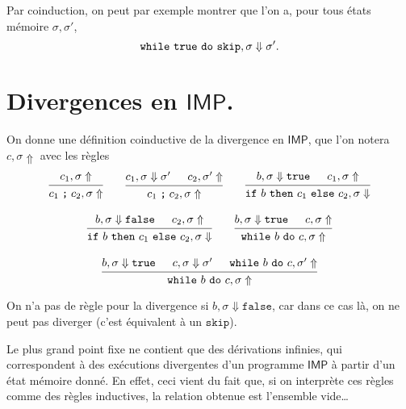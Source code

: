\documentclass[../main]{subfiles}
\begin{document}
  Par coinduction, on peut par exemple montrer que l'on a, pour tous états mémoire $\sigma, \sigma'$, \[
    \texttt{while}\ \texttt{true}\ \texttt{do}\ \texttt{skip}, \sigma \Downarrow \sigma'
  .\] 

  \section{Divergences en $\mathsf{IMP}$.}

  On donne une définition coinductive de la divergence en $\mathsf{IMP}$, que l'on notera $c, \sigma \Uparrow$ avec les règles 
  \begin{gather*}
    \begin{prooftree}
      \hypo{c_1, \sigma \Uparrow}
      \infer 1{c_1 \col c_2, \sigma \Uparrow}
    \end{prooftree}
    \quad\quad
    \begin{prooftree}
      \hypo{c_1, \sigma \Downarrow \sigma'}
      \hypo{c_2, \sigma' \Uparrow}
      \infer 2{c_1 \col c_2, \sigma \Uparrow}
    \end{prooftree}
    \quad\quad
    \begin{prooftree}
      \hypo{b, \sigma \Downarrow \mathtt{true}}
      \hypo{c_1, \sigma \Uparrow}
      \infer 2{\ifte b {c_1} {c_2}, \sigma \Downarrow}
    \end{prooftree}\\[1em]
    \begin{prooftree}
      \hypo{b, \sigma \Downarrow \mathtt{false}}
      \hypo{c_2, \sigma \Uparrow}
      \infer 2{\ifte b {c_1} {c_2}, \sigma \Downarrow}
    \end{prooftree}
    \quad\quad
    \begin{prooftree}
      \hypo{b, \sigma \Downarrow \mathtt{true}}
      \hypo{c, \sigma \Uparrow}
      \infer 2{\while b c, \sigma \Uparrow}
    \end{prooftree}\\[1em]
    \begin{prooftree}
      \hypo{b, \sigma \Downarrow \mathtt{true}}
      \hypo{c, \sigma \Downarrow \sigma'}
      \hypo{\while b c, \sigma' \Uparrow}
      \infer 3{\while b c, \sigma \Uparrow}
    \end{prooftree}
  \end{gather*}

  On n'a pas de règle pour la divergence si $b, \sigma \Downarrow \mathtt{false}$, car dans ce cas là, on ne peut pas diverger (c'est équivalent à un $\mathtt{skip}$).

  Le plus grand point fixe ne contient que des dérivations infinies, qui correspondent à des exécutions divergentes d’un programme $\mathsf{IMP}$ à partir d’un état mémoire donné.
  En effet, ceci vient du fait que, si on interprète ces règles comme des règles inductives, la relation obtenue est l'ensemble vide\ldots
\end{document}
